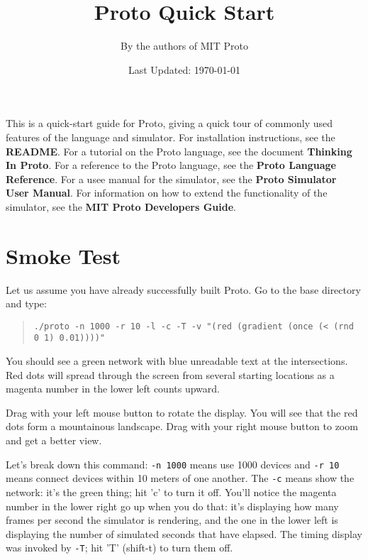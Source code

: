 \documentclass{article}
\title{Proto Quick Start}
\author{By the authors of MIT Proto}
\date{Last Updated: \today}
\newcommand\code[1]{\begin{quote}\var{#1}\end{quote}}
\newcommand\var[1]{{\tt #1}}
\begin{document}
\maketitle

This is a quick-start guide for Proto, giving a quick tour of commonly
used features of the language and simulator.  For installation
instructions, see the {\bf README}.  For a tutorial on the Proto
language, see the document {\bf Thinking In Proto}.  For a reference
to the Proto language, see the {\bf Proto Language Reference}.  For a
usee manual for the simulator, see the {\bf Proto Simulator User
  Manual}.  For information on how to extend the functionality of the
simulator, see the {\bf MIT Proto Developers Guide}.



\section{Smoke Test}

Let us assume you have already successfully built Proto.
Go to the base directory and type:
\code{./proto -n 1000 -r 10 -l -c -T -v "(red (gradient (once (< (rnd
  0 1) 0.01))))"}
You should see a green network with blue unreadable text at the
intersections.  Red dots will spread through the screen from
several starting locations as a magenta number in the lower
left counts upward.

Drag with your left mouse button to rotate the display.  You will see
that the red dots form a mountainous landscape.  Drag with your right
mouse button to zoom and get a better view.

Let's break down this command: \var{-n 1000} means use 1000 devices
and \var{-r 10} means connect devices within 10 meters of one another.
The \var{-c} means show the network: it's the green thing; hit 'c' to
turn it off.  You'll notice the magenta number in the lower right go
up when you do that: it's displaying how many frames per second the
simulator is rendering, and the one in the lower left is displaying
the number of simulated seconds that have elapsed.  The timing display
was invoked by \var{-T}; hit 'T' (shift-t) to turn them off.
\end{document}
